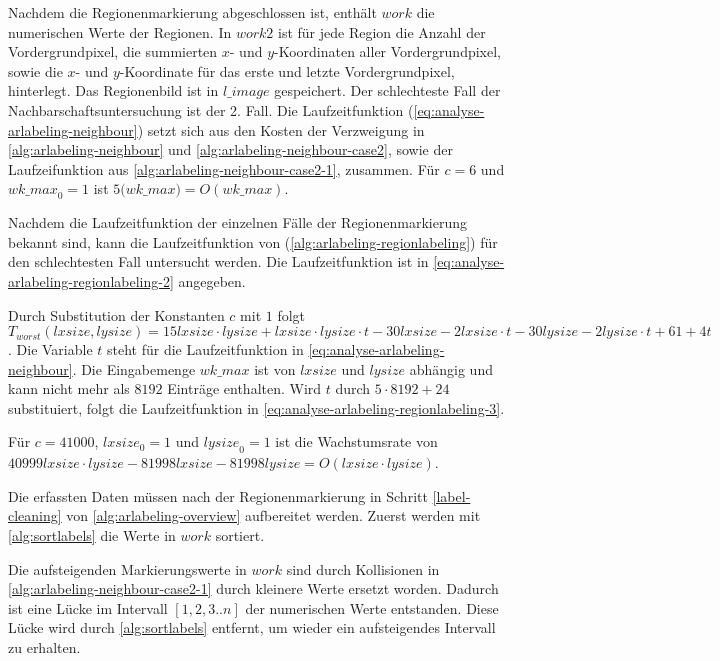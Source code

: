 Nachdem die Regionenmarkierung abgeschlossen ist, enthält $\mathit{work}$ die numerischen Werte der Regionen. In
 $\mathit{work2}$ ist für jede Region die Anzahl der Vordergrundpixel, die summierten $x$- und $y$-Koordinaten aller
 Vordergrundpixel, sowie die $x$- und $y$-Koordinate für das erste und letzte Vordergrundpixel, hinterlegt. Das
 Regionenbild ist in $\mathit{l\_image}$ gespeichert. Der schlechteste Fall der Nachbarschaftsuntersuchung ist der 2.
 Fall. Die Laufzeitfunktion (\autoref{eq:analyse-arlabeling-neighbour}) setzt sich aus den Kosten der Verzweigung in
 \autoref{alg:arlabeling-neighbour} und \autoref{alg:arlabeling-neighbour-case2}, sowie der Laufzeifunktion aus
 \autoref{alg:arlabeling-neighbour-case2-1}, zusammen. Für $c = 6$ und $\mathit{wk\_max}_{0} = 1$ ist
 $5 \mathit(wk\_max) = O(\mathit{wk\_max})$.


Nachdem die Laufzeitfunktion der einzelnen Fälle der Regionenmarkierung bekannt sind, kann die Laufzeitfunktion von
  (\autoref{alg:arlabeling-regionlabeling}) für den schlechtesten Fall untersucht werden. Die
 Laufzeitfunktion ist in \autoref{eq:analyse-arlabeling-regionlabeling-2} angegeben.

Durch Substitution der Konstanten $c$ mit $1$ folgt $T_{worst}(\mathit{lxsize},\mathit{lysize}) = 15 \mathit{lxsize}
 \cdot \mathit{lysize} + \mathit{lxsize} \cdot \mathit{lysize} \cdot t - 30 \mathit{lxsize} - 2 \mathit{lxsize} \cdot t
 -30 \mathit{lysize} - 2 \mathit{lysize} \cdot t + 61 + 4t$. Die Variable $t$ steht für die Laufzeitfunktion in
 \autoref{eq:analyse-arlabeling-neighbour}. Die Eingabemenge $\mathit{wk\_max}$ ist von $\mathit{lxsize}$ und
 $\mathit{lysize}$ abhängig und kann nicht mehr als $8192$ Einträge enthalten. Wird $t$ durch $5 \cdot 8192 + 24$
 substituiert, folgt die Laufzeitfunktion in \autoref{eq:analyse-arlabeling-regionlabeling-3}.

Für $c = 41000$, $\mathit{lxsize}_{0} = 1$ und $\mathit{lysize}_{0} = 1$ ist die Wachstumsrate von
 $40999\mathit{lxsize}\cdot\mathit{lysize} -81998\mathit{lxsize} -81998\mathit{lysize}
 = O(\mathit{lxsize}\cdot\mathit{lysize})$.

Die erfassten Daten müssen nach der Regionenmarkierung in Schritt \ref{label-cleaning} von
 \autoref{alg:arlabeling-overview} aufbereitet werden. Zuerst werden mit \autoref{alg:sortlabels} die Werte in
 $\mathit{work}$ sortiert.

Die aufsteigenden Markierungswerte in $\mathit{work}$ sind durch Kollisionen in
 \autoref{alg:arlabeling-neighbour-case2-1} durch kleinere Werte ersetzt worden. Dadurch ist eine Lücke im Intervall
 $\left[1,2,3..n\right]$ der numerischen Werte entstanden. Diese Lücke wird durch \autoref{alg:sortlabels}
 entfernt, um wieder ein aufsteigendes Intervall zu erhalten.

